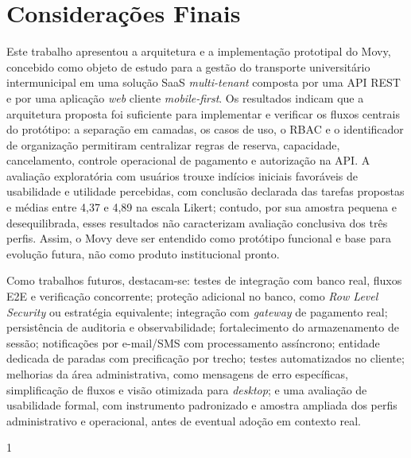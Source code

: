\documentclass[a4paper,12pt]{article}
\begin{document}
\section{Considerações Finais}
\label{sec:conclusoes}

Este trabalho apresentou a arquitetura e a implementação prototipal do Movy, concebido como objeto de estudo para a gestão do transporte universitário intermunicipal em uma solução SaaS \textit{multi-tenant} composta por uma API REST e por uma aplicação \textit{web} cliente \textit{mobile-first}. Os resultados indicam que a arquitetura proposta foi suficiente para implementar e verificar os fluxos centrais do protótipo: a separação em camadas, os casos de uso, o RBAC e o identificador de organização permitiram centralizar regras de reserva, capacidade, cancelamento, controle operacional de pagamento e autorização na API. A avaliação exploratória com usuários trouxe indícios iniciais favoráveis de usabilidade e utilidade percebidas, com conclusão declarada das tarefas propostas e médias entre 4,37 e 4,89 na escala Likert; contudo, por sua amostra pequena e desequilibrada, esses resultados não caracterizam avaliação conclusiva dos três perfis. Assim, o Movy deve ser entendido como protótipo funcional e base para evolução futura, não como produto institucional pronto.

Como trabalhos futuros, destacam-se: testes de integração com banco real, fluxos E2E e verificação concorrente; proteção adicional no banco, como \textit{Row Level Security} ou estratégia equivalente; integração com \textit{gateway} de pagamento real; persistência de auditoria e observabilidade; fortalecimento do armazenamento de sessão; notificações por e-mail/SMS com processamento assíncrono; entidade dedicada de paradas com precificação por trecho; testes automatizados no cliente; melhorias da área administrativa, como mensagens de erro específicas, simplificação de fluxos e visão otimizada para \textit{desktop}; e uma avaliação de usabilidade formal, com instrumento padronizado e amostra ampliada dos perfis administrativo e operacional, antes de eventual adoção em contexto real.

\begin{spacing}{1}

\end{spacing}

\end{document}
